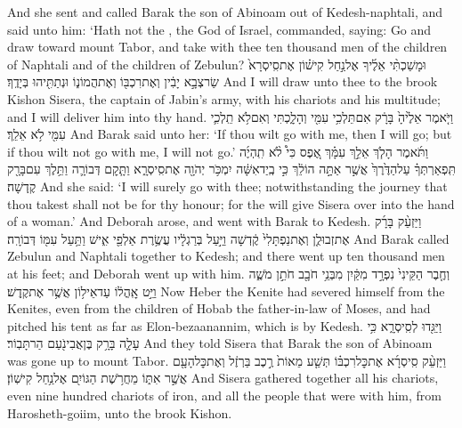 {And she sent and called Barak the son of Abinoam out of Kedesh-naphtali, and said unto him: ‘Hath not the \lord, the God of Israel, commanded, saying: Go and draw toward mount Tabor, and take with thee ten thousand men of the children of Naphtali and of the children of Zebulun?}
{וּמָשַׁכְתִּ֨י אֵלֶ֜יךָ אֶל\maqqaf נַ֣חַל קִישׁ֗וֹן אֶת\maqqaf סִֽיסְרָא֙ שַׂר\maqqaf צְבָ֣א יָבִ֔ין וְאֶת\maqqaf רִכְבּ֖וֹ וְאֶת\maqqaf הֲמוֹנ֑וֹ וּנְתַתִּ֖יהוּ בְּיָדֶֽךָ׃}
{And I will draw unto thee to the brook Kishon Sisera, the captain of Jabin’s army, with his chariots and his multitude; and I will deliver him into thy hand.}
{וַיֹּ֤אמֶר אֵלֶ֙יהָ֙ בָּרָ֔ק אִם\maqqaf תֵּלְכִ֥י עִמִּ֖י וְהָלָ֑כְתִּי וְאִם\maqqaf לֹ֥א תֵֽלְכִ֛י עִמִּ֖י לֹ֥א אֵלֵֽךְ׃}
{And Barak said unto her: ‘If thou wilt go with me, then I will go; but if thou wilt not go with me, I will not go.’}
{וַתֹּ֜אמֶר הָלֹ֧ךְ אֵלֵ֣ךְ עִמָּ֗ךְ אֶ֚פֶס כִּי֩ לֹ֨א תִֽהְיֶ֜ה תִּֽפְאַרְתְּךָ֗ עַל\maqqaf הַדֶּ֙רֶךְ֙ אֲשֶׁ֣ר אַתָּ֣ה הוֹלֵ֔ךְ כִּ֣י בְֽיַד\maqqaf אִשָּׁ֔ה יִמְכֹּ֥ר יְהֹוָ֖ה אֶת\maqqaf סִֽיסְרָ֑א וַתָּ֧קׇם דְּבוֹרָ֛ה וַתֵּ֥לֶךְ עִם\maqqaf בָּרָ֖ק קֶֽדְשָׁה׃}
{And she said: ‘I will surely go with thee; notwithstanding the journey that thou takest shall not be for thy honour; for the \lord\space will give Sisera over into the hand of a woman.’ And Deborah arose, and went with Barak to Kedesh.}
{וַיַּזְעֵ֨ק בָּרָ֜ק אֶת\maqqaf זְבוּלֻ֤ן וְאֶת\maqqaf נַפְתָּלִי֙ קֶ֔דְשָׁה וַיַּ֣עַל בְּרַגְלָ֔יו עֲשֶׂ֥רֶת אַלְפֵ֖י אִ֑ישׁ וַתַּ֥עַל עִמּ֖וֹ דְּבוֹרָֽה׃}
{And Barak called Zebulun and Naphtali together to Kedesh; and there went up ten thousand men at his feet; and Deborah went up with him.}
{וְחֶ֤בֶר הַקֵּינִי֙ נִפְרָ֣ד מִקַּ֔יִן מִבְּנֵ֥י חֹבָ֖ב חֹתֵ֣ן מֹשֶׁ֑ה וַיֵּ֣ט אׇֽהֳל֔וֹ עַד\maqqaf אֵיל֥וֹן  אֲשֶׁ֥ר אֶת\maqqaf קֶֽדֶשׁ׃}
{Now Heber the Kenite had severed himself from the Kenites, even from the children of Hobab the father-in-law of Moses, and had pitched his tent as far as Elon-bezaanannim, which is by Kedesh.}
{וַיַּגִּ֖דוּ לְסִֽיסְרָ֑א כִּ֥י עָלָ֛ה בָּרָ֥ק בֶּן\maqqaf אֲבִינֹ֖עַם הַר\maqqaf תָּבֽוֹר׃}
{And they told Sisera that Barak the son of Abinoam was gone up to mount Tabor.}
{וַיַּזְעֵ֨ק סִֽיסְרָ֜א אֶת\maqqaf כׇּל\maqqaf רִכְבּ֗וֹ תְּשַׁ֤ע מֵאוֹת֙ רֶ֣כֶב בַּרְזֶ֔ל וְאֶת\maqqaf כׇּל\maqqaf הָעָ֖ם אֲשֶׁ֣ר אִתּ֑וֹ מֵחֲרֹ֥שֶׁת הַגּוֹיִ֖ם אֶל\maqqaf נַ֥חַל קִישֽׁוֹן׃}
{And Sisera gathered together all his chariots, even nine hundred chariots of iron, and all the people that were with him, from Harosheth-goiim, unto the brook Kishon.}
